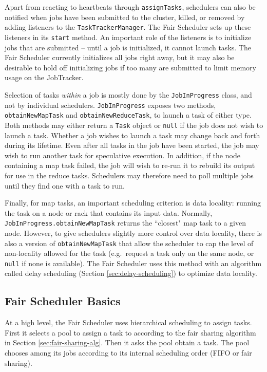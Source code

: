 \documentclass[11pt]{article}
\begin{document}
Apart from reacting to heartbeats through {\tt assignTasks}, schedulers can also be notified when jobs have been submitted to the cluster, killed, or removed by adding listeners to the {\tt TaskTrackerManager}. The Fair Scheduler sets up these listeners in its {\tt start} method. An important role of the listeners is to initialize jobs that are submitted -- until a job is initialized, it cannot launch tasks. The Fair Scheduler currently initializes all jobs right away, but it may also be desirable to hold off initializing jobs if too many are submitted to limit memory usage on the JobTracker.

Selection of tasks \emph{within} a job is mostly done by the {\tt JobInProgress} class, and not by individual schedulers. {\tt JobInProgress} exposes two methods, {\tt obtainNewMapTask} and {\tt obtainNewReduceTask}, to launch a task of either type. Both methods may either return a {\tt Task} object or {\tt null} if the job does not wish to launch a task. Whether a job wishes to launch a task may change back and forth during its lifetime. Even after all tasks in the job have been started, the job may wish to run another task for speculative execution. In addition, if the node containing a map task failed, the job will wish to re-run it to rebuild its output for use in the reduce tasks. Schedulers may therefore need to poll multiple jobs until they find one with a task to run.

Finally, for map tasks, an important scheduling criterion is data locality: running the task on a node or rack that contains its input data. Normally, {\tt JobInProgress.obtainNewMapTask} returns the ``closest" map task to a given node. However, to give schedulers slightly more control over data locality, there is also a version of {\tt obtainNewMapTask} that allow the scheduler to cap the level of non-locality allowed for the task (e.g.~request a task only on the same node, or {\tt null} if none is available). The Fair Scheduler uses this method with an algorithm called delay scheduling (Section \ref{sec:delay-scheduling}) to optimize data locality.

\subsection{Fair Scheduler Basics}

At a high level, the Fair Scheduler uses hierarchical scheduling to assign tasks. First it selects a pool to assign a task to according to the fair sharing algorithm in Section \ref{sec:fair-sharing-alg}. Then it asks the pool obtain a task. The pool chooses among its jobs according to its internal scheduling order (FIFO or fair sharing).
\end{document}
